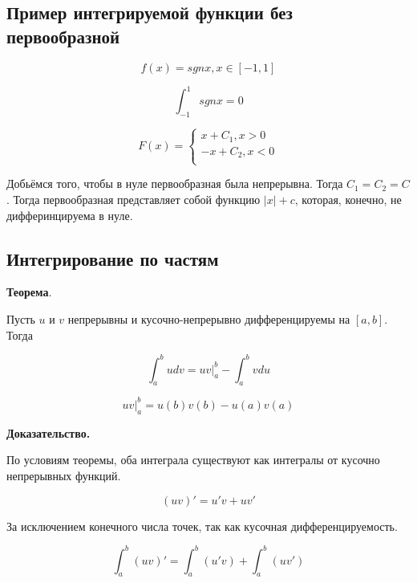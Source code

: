 \documentclass[a4paper]{article}
\begin{document}
\begin{definit}
\subsection*{Пример интегрируемой функции без первообразной}

\[
f(x) = sgn x, x \in [-1,1]
\]

\[
\int_{-1}^1 sgn x = 0
\]

\[
F(x) = \begin{cases}
x+C_1, x>0\\
-x+C_2, x<0\\
\end{cases}
\]

Добьёмся того, чтобы в нуле первообразная была непрерывна. Тогда $C_1 = C_2 = C$. Тогда первообразная представляет собой функцию $|x|+c$, которая, конечно, не дифферинцируема в нуле.
\end{definit}


\begin{definit}
\subsection*{Интегрирование по частям}

\begin{htheorem}\textbf{Теорема}.

Пусть $u$ и $v$ непрерывны и кусочно-непрерывно дифференцируемы на $[a,b]$. Тогда

\[
\int_a^b udv = uv |_a^b - \int_a^b vdu
\]

\[
uv |_a^b = u(b)v(b) - u(a)v(a)
\]
\end{htheorem}

\begin{hproof}\textbf{Доказательство.}

По условиям теоремы, оба интеграла существуют как интегралы от кусочно непрерывных функций.

\[
(uv)' = u'v + uv'
\]

За исключением конечного числа точек, так как кусочная дифференцируемость.

\[
\int_a^b (uv)' = \int_a^b (u'v) + \int_a^b (uv')
\]
\end{hproof}
\end{definit}
\end{document}

